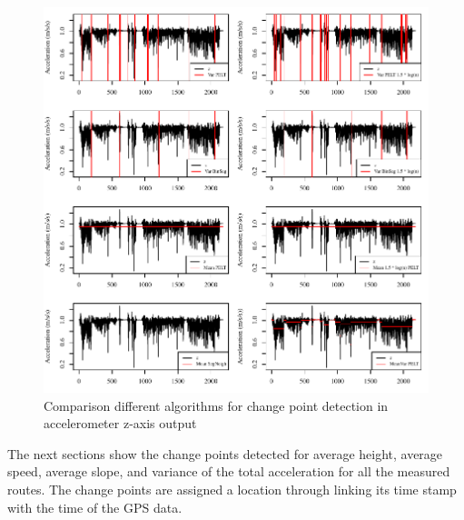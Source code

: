 
\begin{figure}[ht]
\includegraphics[width=\textwidth]{img/R_comparisonMethodsZ.pdf}
\centering
\caption{Comparison different algorithms for change point detection \newline in accelerometer z-axis output\label{cpcomp}}
\end{figure} 


The next sections show the change points detected for average height, average speed, average slope, and variance of the total acceleration for all the measured routes. The change points are assigned a location through linking its time stamp with the time of the GPS data. 

